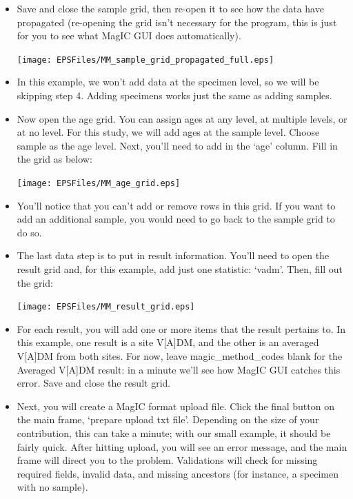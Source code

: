 \documentclass[11pt]{book}
\begin{document}
{\begin{itemize}
    \texttt{[image: EPSFiles/MM\_sample\_grid\_added\_cols.eps]}

  \item Save and close the sample grid, then re-open it to see how the data have propagated (re-opening the grid isn't necessary for the program, this is just for you to see what MagIC GUI does automatically).

    \texttt{[image: EPSFiles/MM\_sample\_grid\_propagated\_full.eps]}

  \item In this example, we won't add data at the specimen level, so we will be skipping step 4.  Adding specimens works just the same as adding samples.

  \item Now open the age grid.  You can assign ages at any level, at multiple levels, or at no level.  For this study, we will add ages at the sample level.  Choose sample as the age level.  Next, you'll need to add in the `age' column.  Fill in the grid as below:

    \texttt{[image: EPSFiles/MM\_age\_grid.eps]}

  \item You'll notice that you can't add or remove rows in this grid.  If you want to add an additional sample, you would need to go back to the sample grid to do so.

  \item The last data step is to put in result information.  You'll need to open the result grid and, for this example, add just one statistic: `vadm'.  Then, fill out the grid:

    \texttt{[image: EPSFiles/MM\_result\_grid.eps]}

  \item For each result, you will add one or more items that the result pertains to.  In this example, one result is a site V[A]DM, and the other is an averaged V[A]DM from both sites.  For now, leave magic\_method\_codes blank for the Averaged V[A]DM result: in a minute we'll see how MagIC GUI catches this error.  Save and close the result grid.

  \item Next, you will create a MagIC format upload file.  Click the final button on the main frame, `prepare upload txt file'.  Depending on the size of your contribution, this can take a minute; with our small example, it should be fairly quick.  After hitting upload, you will see an error message, and the main frame will direct you to the problem.  Validations will check for missing required fields, invalid data, and missing ancestors (for instance, a specimen with no sample).


\end{itemize}}
\end{document}
